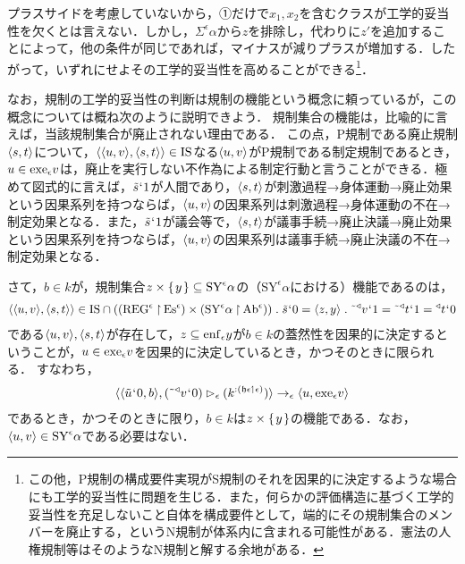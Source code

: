プラスサイドを考慮していないから，①だけで$ x_1,x_2 $を含むクラスが工学的妥当性を欠くとは言えない．しかし，$ \varSigma^{\epsilon}\alpha $から$z$を排除し，代わりに$z'$を追加することによって，他の条件が同じであれば，マイナスが減りプラスが増加する．したがって，いずれにせよその工学的妥当性を高めることができる\footnote{
    この他，P規制の構成要件実現がS規制のそれを因果的に決定するような場合にも工学的妥当性に問題を生じる．また，何らかの評価構造に基づく工学的妥当性を充足しないこと自体を構成要件として，端的にその規制集合のメンバーを廃止する，というN規制が体系内に含まれる可能性がある．憲法の人権規制等はそのようなN規制と解する余地がある．
}．

なお，規制の工学的妥当性の判断は規制の機能という概念に頼っているが，この概念については概ね次のように説明できよう．
規制集合の機能は，比喩的に言えば，当該規制集合が廃止されない理由である．
この点，P規制である廃止規制$ \langle s,t \rangle $について，$ \langle \langle u,v \rangle,\langle s,t \rangle \rangle\in \mathrm{IS} $なる$ \langle u,v \rangle $がP規制である制定規制であるとき，$u\in\mathrm{exe}_{\epsilon} v$は，廃止を実行しない不作為による制定行動と言うことができる．極めて図式的に言えば，$ \tilde{s}{\mspace{1mu}{`}\mspace{1mu}} 1 $が人間であり，$ \langle s,t \rangle $が刺激過程→身体運動→廃止効果という因果系列を持つならば，$ \langle u,v \rangle $の因果系列は刺激過程→身体運動の不在→制定効果となる．また，$ \tilde{s}{\mspace{1mu}{`}\mspace{1mu}} 1 $が議会等で，$ \langle s,t \rangle $が議事手続→廃止決議→廃止効果という因果系列を持つならば，$ \langle u,v \rangle $の因果系列は議事手続→廃止決議の不在→制定効果となる．

さて，$b\in k$が，規制集合$ z\times\{\mspace{2mu}y\mspace{2mu}\}\subseteq\mathrm{SY}^{\epsilon}\alpha $の（$ \mathrm{SY}^{\epsilon}\alpha $における）機能であるのは，
\begin{align*}
    \orp{\orp{u,v},\orp{s,t}}\in\mathrm{IS}\cap((\mathrm{REG}^\epsilon\uphr\mathrm{Es}^\epsilon)\times(\mathrm{SY}^{\epsilon}\alpha\uphr\mathrm{Ab}^\epsilon))
    \con{1}\tilde{s}\fap 0 = \orp{z,y}\con{1}\tildel{\trgl{v}}\fap 1 = \tildel{\trgl{t}}\fap 1 = \trgl{t}\fap 0
\end{align*}
である$ \langle u,v \rangle,\langle s,t \rangle $が存在して，$ z\subseteq\mathrm{enf}_{\epsilon}y $が$b\in k$の蓋然性を因果的に決定するということが，$ u\in\mathrm{exe}_{\epsilon} v $を因果的に決定しているとき，かつそのときに限られる．
すなわち，
\begin{align*}
    \langle \langle \tilde{u}{\mspace{1mu}{`}\mspace{1mu}} 0,b \rangle,(\tilde{\:\:}{^\triangleleft}v{\mspace{1mu}{`}\mspace{1mu}} 0)\mathbin{\vartriangleright_{\epsilon}}(k^{:(\mathfrak{h}\epsilon\mathbin{\upharpoonleft}\epsilon)}) \rangle
    \to_{\epsilon}\langle u,\mathrm{exe}_{\epsilon}{v} \rangle
\end{align*}
であるとき，かつそのときに限り，$ b\in k $は$ z\times\{\mspace{2mu}y\mspace{2mu}\} $の機能である．なお，$ \langle u,v \rangle\in\mathrm{SY}^{\epsilon}\alpha $である必要はない．

